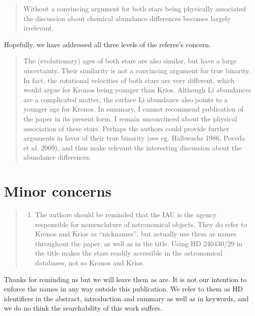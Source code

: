 \documentclass[12pt]{article}
\begin{document}
\begin{quote}
Without a convincing argument for both stars being physically associated
the discussion about chemical abundance differences becomes largely
irrelevant.
\end{quote}

Hopefully, we have addressed all three levels of the referee's concern.


\begin{quote}
The (evolutionary) ages of both stars are also similar, but have a large
uncertainty. Their similarity is not a convincing argument for true
binarity.
In fact, the rotational velocities of both stars are very different,
which would argue for Kronos being younger than Krios. Although Li
abundances are a complicated matter, the surface Li abundance also
points to a younger age for Kronos. In summary, I cannot recommend
publication of the paper in its present form. I remain unconvinced about
the physical association of these stars. Perhaps the authors could
provide further arguments in favor of their true binarity (see eg.
Halbwachs 1986, Poveda et al. 2009), and thus make relevant the
interesting discussion about the abundance differences.
\end{quote}


\section*{Minor concerns}\label{minor-concerns}

\begin{quote}
\begin{enumerate}
\def\labelenumi{\arabic{enumi}.}
\itemsep1pt\parskip0pt
\item
  The authors should be reminded that the IAU is the agency responsible
  for nomenclature of astronomical objects. They do refer to Kronos and
  Krios as ``nicknames'', but actually use them as names throughout the
  paper, as well as in the title. Using HD 240430/29 in the title makes
  the stars readily accessible in the astronomical databases, not so
  Kronos and Krios.
\end{enumerate}
\end{quote}

Thanks for reminding us but we will leave them as are. It is not our intention
to enforce the names in any way outside this publication. We refer to them as HD
identifiers in the abstract, introduction and summary as well as in keywords,
and we do no think the searchability of this work suffers.
\end{document}
